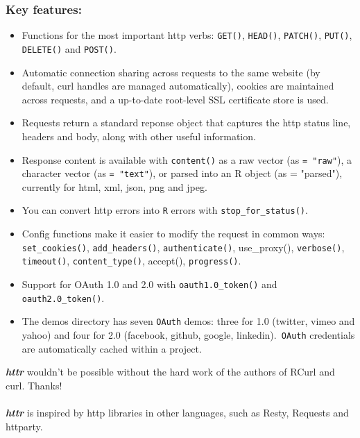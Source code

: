 \documentclass[12pt]{article}
\begin{document}
\subsubsection*{Key features:}
\begin{itemize}
\item Functions for the most important http verbs: \texttt{GET()}, \texttt{HEAD()}, \texttt{PATCH()}, \texttt{PUT()}, \texttt{DELETE()} and \texttt{POST()}.

\item Automatic connection sharing across requests to the same website (by default, curl handles are managed automatically), cookies are maintained across requests, and a up-to-date root-level SSL certificate store is used.

\item Requests return a standard reponse object that captures the http status line, headers and body, along with other useful information.

\item Response content is available with \texttt{content()} as a raw vector (as \texttt{= "raw"}), a character vector (as \texttt{= "text"}), or parsed into an R object (as = "parsed"), currently for html, xml, json, png and jpeg.

\item You can convert http errors into \texttt{R} errors with \texttt{stop\_for\_status()}.

\item Config functions make it easier to modify the request in common ways: \texttt{set\_cookies()}, \texttt{add\_headers()}, \texttt{authenticate()}, use\_proxy(), \texttt{verbose()}, \texttt{timeout()}, \texttt{content\_type()}, accept(), \texttt{progress()}.

\item Support for OAuth 1.0 and 2.0 with \texttt{oauth1.0\_token()} and \texttt{oauth2.0\_token()}. 

\item The demos directory has seven \texttt{OAuth} demos: three for 1.0 (twitter, vimeo and yahoo) and four for 2.0 (facebook, github, google, linkedin).\texttt{ OAuth} credentials are automatically cached within a project.
\end{itemize}

\noindent \textbf{\textit{httr}} wouldn't be possible without the hard work of the authors of RCurl and curl. Thanks! \\\\ \textbf{\textit{httr}} is inspired by http libraries in other languages, such as Resty, Requests and httparty.
\end{document}
